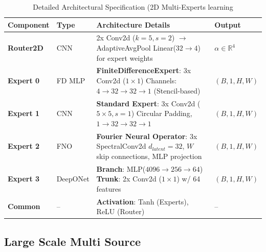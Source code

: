 \documentclass[preprint,12pt,authoryear]{elsarticle}
\begin{document}
\begin{table}[ht]
\centering
\caption{Detailed Architectural Specification (2D Multi-Experts learning}
\label{tab:hetero_combiner}
\small
\begin{tabularx}{\textwidth}{@{} l l X l @{}}
\toprule
\textbf{Component} & \textbf{Type} & \textbf{Architecture Details} & \textbf{Output} \\ \midrule

\textbf{Router2D} & CNN & 2x Conv2d ($k=5, s=2$) $\to$ AdaptiveAvgPool \newline Linear($32 \to 4$) for expert weights & $\alpha \in \mathbb{R}^{4}$ \\ \midrule

\textbf{Expert 0} & FD MLP & \textbf{FiniteDifferenceExpert}: 3x Conv2d ($1 \times 1$) \newline Channels: $4 \to 32 \to 32 \to 1$ (Stencil-based) & $(B, 1, H, W)$ \\ \addlinespace

\textbf{Expert 1} & CNN & \textbf{Standard Expert}: 3x Conv2d ($5 \times 5, s=1$) \newline Circular Padding, $1 \to 32 \to 32 \to 1$ & $(B, 1, H, W)$ \\ \addlinespace

\textbf{Expert 2} & FNO & \textbf{Fourier Neural Operator}: 3x SpectralConv2d \newline $d_{latent}=32$, $W$ skip connections, MLP projection & $(B, 1, H, W)$ \\ \addlinespace

\textbf{Expert 3} & DeepONet & \textbf{Branch}: MLP($4096 \to 256 \to 64$) \newline \textbf{Trunk}: 2x Conv2d ($1 \times 1$) w/ 64 features & $(B, 1, H, W)$ \\ \midrule

\textbf{Common} & -- & \textbf{Activation}: Tanh (Experts), ReLU (Router) & -- \\ 
\bottomrule
\end{tabularx}
\end{table}

\subsection{Large Scale Multi Source}
\end{document}
